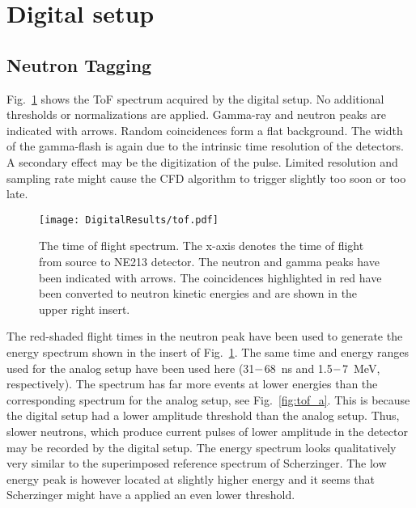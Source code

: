 \documentclass[main.tex]{subfiles}
\begin{document}
\newpage
\section{Digital setup}
\subsection{Neutron Tagging}
Fig.~\ref{fig:tof_d} shows the ToF spectrum acquired by the digital setup. No additional thresholds or normalizations are applied. Gamma-ray and neutron peaks are indicated with arrows. Random coincidences form a flat background. The width of the gamma-flash is again due to the intrinsic time resolution of the detectors. A secondary effect may be the digitization of the pulse. Limited resolution and sampling rate might cause the CFD algorithm to trigger slightly too soon or too late. 

\begin{figure}[ht]
    \centering
        \texttt{[image: DigitalResults/tof.pdf]}
        \caption[Time of flight spectrum, digital setup.]{The time of flight spectrum. The x-axis denotes the time of flight from source to NE213 detector. The neutron and gamma peaks have been indicated with arrows. The coincidences highlighted in red have been converted to neutron kinetic energies and are shown in the upper right insert.}
        \label{fig:tof_d} 
\end{figure}

The red-shaded flight times in the neutron peak have been used to generate the energy spectrum shown in the insert of Fig.~\ref{fig:tof_d}. The same time and energy ranges used for the analog setup have been used here (31$\--$\SI{68}{\ns} and 1.5$\--$\SI{7}{\MeV}, respectively). The spectrum has far more events at lower energies than the corresponding spectrum for the analog setup, see Fig.~\ref{fig:tof_a}. This is because the digital setup had a lower amplitude threshold than the analog setup. Thus, slower neutrons, which produce current pulses of lower amplitude in the detector may be recorded by the digital setup. The energy spectrum looks qualitatively very similar to the superimposed reference spectrum of Scherzinger. The low energy peak is however located at slightly higher energy and it seems that Scherzinger might have a applied an even lower threshold. 
\end{document}
